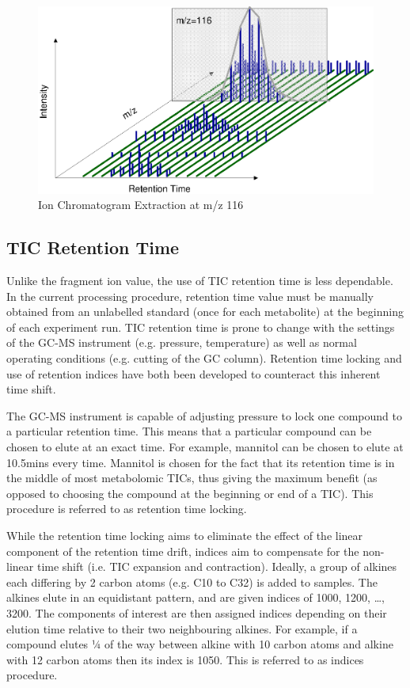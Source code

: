 \begin{figure}
  \begin{center}
    \includegraphics[scale=0.7]{graphics/chapter08/82.eps}
  \end{center}
  \caption{Ion Chromatogram Extraction at m/z 116}
  \label{fig:82}
\end{figure}

\subsection
{TIC Retention Time}
Unlike the fragment ion value, the use of TIC retention time is less dependable. 
In the current processing procedure, retention time value must be manually 
obtained from an unlabelled standard (once for each metabolite) at the 
beginning of each experiment run. TIC retention time is prone to change with 
the settings of the GC-MS instrument (e.g. pressure, temperature) as well as 
normal operating conditions (e.g. cutting of the GC column). Retention time 
locking and use of retention indices have both been developed to counteract 
this inherent time shift. 

The GC-MS instrument is capable of adjusting pressure to lock one compound to a 
particular retention time. This means that a particular compound can be chosen 
to elute at an exact time. For example, mannitol can be chosen to elute 
at 10.5mins every time. Mannitol is chosen for the fact that its retention time 
is in the middle of most metabolomic TICs, thus giving the maximum benefit (as 
opposed to choosing the compound at the beginning or end of a TIC). This 
procedure is referred to as retention time locking.

While the retention time locking aims to eliminate the effect of the linear 
component of the retention time drift, indices aim to compensate for the 
non-linear time shift (i.e. TIC expansion and contraction). Ideally, a group 
of alkines each differing by 2 carbon atoms (e.g. C10 to C32) is added to 
samples. The alkines elute in an equidistant pattern, and are given indices of 
1000, 1200, …, 3200. The components of interest are then assigned indices 
depending on their elution time relative to their two neighbouring alkines. For 
example, if a compound elutes ¼ of the way between alkine with 10 carbon atoms 
and alkine with 12 carbon atoms then its index is 1050. This is referred to as 
indices procedure.


